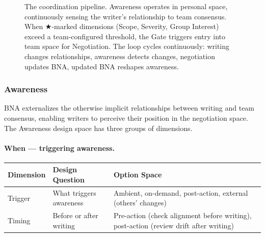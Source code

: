\begin{figure}[t]
\centering
{}
\caption{The coordination pipeline. Awareness operates in personal space, continuously sensing the writer's relationship to team consensus. When $\bigstar$-marked dimensions (Scope, Severity, Group Interest) exceed a team-configured threshold, the Gate triggers entry into team space for Negotiation. The loop cycles continuously: writing changes relationships, awareness detects changes, negotiation updates BNA, updated BNA reshapes awareness.}
\label{fig:pipeline}
\end{figure}


\subsubsection{Awareness}
\label{sec:awareness}

BNA externalizes the otherwise implicit relationships between writing and team consensus, enabling writers to perceive their position in the negotiation space. The Awareness design space has three groups of dimensions.

\paragraph{When --- triggering awareness.}

\begin{table}[h]
\small
\begin{tabular}{@{}lp{2.5cm}p{4cm}@{}}
\toprule
\textbf{Dimension} & \textbf{Design Question} & \textbf{Option Space} \\
\midrule
Trigger & What triggers awareness & Ambient, on-demand, post-action, external (others' changes) \\
Timing & Before or after writing & Pre-action (check alignment before writing), post-action (review drift after writing) \\
\bottomrule
\end{tabular}
\end{table}

